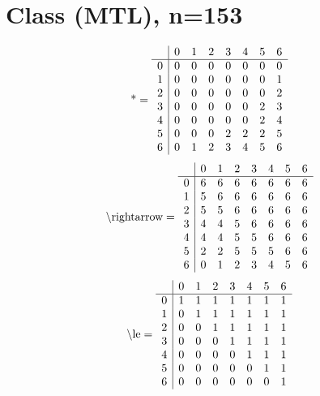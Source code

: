 \documentclass[11pt]{article}
\begin{document}
\section{Class (MTL), n=153}
\[\text{*} = 
\begin{array}{r | r r r r r r r}
 & 0 & 1 & 2 & 3 & 4 & 5 & 6 \\ \hline
0 & 0 & 0 & 0 & 0 & 0 & 0 & 0 \\
1 & 0 & 0 & 0 & 0 & 0 & 0 & 1 \\
2 & 0 & 0 & 0 & 0 & 0 & 0 & 2 \\
3 & 0 & 0 & 0 & 0 & 0 & 2 & 3 \\
4 & 0 & 0 & 0 & 0 & 0 & 2 & 4 \\
5 & 0 & 0 & 0 & 2 & 2 & 2 & 5 \\
6 & 0 & 1 & 2 & 3 & 4 & 5 & 6 \\
\end{array}
\]
\[\text{\textbackslash rightarrow} = 
\begin{array}{r | r r r r r r r}
 & 0 & 1 & 2 & 3 & 4 & 5 & 6 \\ \hline
0 & 6 & 6 & 6 & 6 & 6 & 6 & 6 \\
1 & 5 & 6 & 6 & 6 & 6 & 6 & 6 \\
2 & 5 & 5 & 6 & 6 & 6 & 6 & 6 \\
3 & 4 & 4 & 5 & 6 & 6 & 6 & 6 \\
4 & 4 & 4 & 5 & 5 & 6 & 6 & 6 \\
5 & 2 & 2 & 5 & 5 & 5 & 6 & 6 \\
6 & 0 & 1 & 2 & 3 & 4 & 5 & 6 \\
\end{array}
\]
\[\text{\textbackslash le} = 
\begin{array}{r | r r r r r r r}
 & 0 & 1 & 2 & 3 & 4 & 5 & 6 \\ \hline
0 & 1 & 1 & 1 & 1 & 1 & 1 & 1 \\
1 & 0 & 1 & 1 & 1 & 1 & 1 & 1 \\
2 & 0 & 0 & 1 & 1 & 1 & 1 & 1 \\
3 & 0 & 0 & 0 & 1 & 1 & 1 & 1 \\
4 & 0 & 0 & 0 & 0 & 1 & 1 & 1 \\
5 & 0 & 0 & 0 & 0 & 0 & 1 & 1 \\
6 & 0 & 0 & 0 & 0 & 0 & 0 & 1 \\
\end{array}
\]
\end{document}
